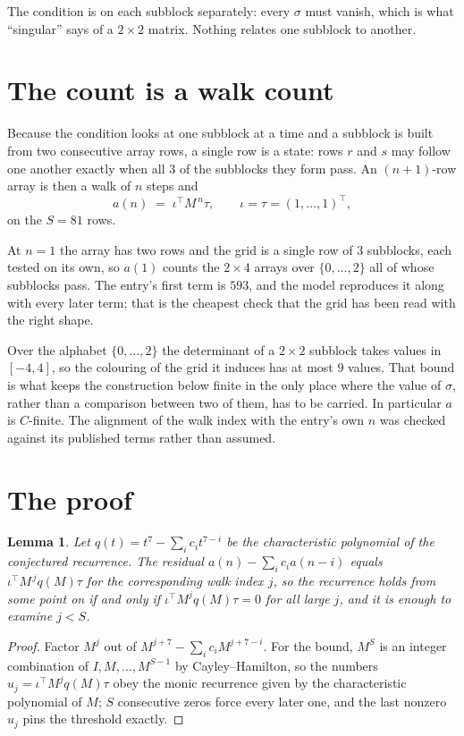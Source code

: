 \documentclass[11pt,a4paper]{article}
\theoremstyle{plain}
\newtheorem{lemma}[theorem]{Lemma}
\theoremstyle{definition}
\begin{document}
The condition is on each subblock separately: every $\sigma$ must vanish, which is what
``singular'' says of a $2\times2$ matrix. Nothing
relates one subblock to another.

\section{The count is a walk count}

Because the condition looks at one subblock at a time and a subblock is
built from two consecutive array rows, a single row is a state: rows $r$ and $s$ may follow one
another exactly when all $3$ of the subblocks they form pass. An $(n+1)$-row array is then a
walk of $n$ steps and
\[
a(n)\;=\;\iota^{\!\top}M^{\,n}\tau,\qquad\iota=\tau=(1,\dots,1)^{\!\top},
\]
on the $S=81$ rows.

At $n=1$ the array has two rows and the grid is a single row of $3$
subblocks, each tested on its own, so $a(1)$ counts the
$2\times4$ arrays over $\{0,\dots,2\}$ all of whose subblocks pass. The entry's
first term is $593$, and the model reproduces it along with every later term; that is the
cheapest check that the grid has been read with the right shape.

Over the alphabet $\{0,\dots,2\}$ the determinant of a $2\times2$ subblock takes values in
$[-4,4]$, so the colouring of the grid it induces has at most $9$ values.
That bound is what keeps the construction below finite in the only place where the value of
$\sigma$, rather than a comparison between two of them, has to be carried.
In particular $a$ is $C$-finite. The alignment of the walk index with the entry's own $n$ was
checked against its published terms rather than assumed.

\section{The proof}

\begin{lemma}\label{lem:crit}
Let $q(t)=t^{7}-\sum_i c_it^{7-i}$ be the characteristic polynomial of the
conjectured recurrence. The residual $a(n)-\sum_ic_ia(n-i)$ equals
$\iota^{\!\top}M^{\,j}q(M)\tau$ for the corresponding walk index $j$, so the recurrence
holds from some point on if and only if $\iota^{\!\top}M^{j}q(M)\tau=0$ for all large $j$,
and it is enough to examine $j<S$.
\end{lemma}

\begin{proof}
Factor $M^{j}$ out of $M^{j+7}-\sum_ic_iM^{j+7-i}$. For the bound, $M^{S}$
is an integer combination of $I,M,\dots,M^{S-1}$ by Cayley--Hamilton, so the numbers
$u_j=\iota^{\!\top}M^{j}q(M)\tau$ obey the monic recurrence given by the characteristic
polynomial of $M$; $S$ consecutive zeros force every later one, and the last nonzero $u_j$
pins the threshold exactly.
\end{proof}
\end{document}
